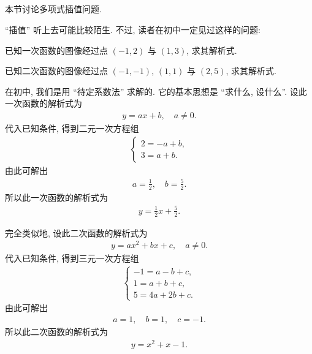 \subsection*{\Interpolation}
\markright{\Interpolation}

本节讨论多项式插值问题.

``插值'' 听上去可能比较陌生. 不过, 读者在初中一定见过这样的问题:

\begin{example}
    已知一次函数的图像经过点 $(-1,2)$ 与 $(1,3)$, 求其解析式.
\end{example}

\begin{example}
    已知二次函数的图像经过点 $(-1,-1)$, $(1,1)$ 与 $(2,5)$, 求其解析式.
\end{example}

在初中, 我们是用 ``待定系数法''  求解的. 它的基本思想是 ``求什么, 设什么''. 设此一次函数的解析式为
\begin{align*}
    y = ax + b, \quad a \neq 0.
\end{align*}
代入已知条件, 得到二元一次方程组
\begin{align*}
    \begin{cases}
        2 = -a + b, \\
        3 = a + b.
    \end{cases}
\end{align*}
由此可解出
\begin{align*}
    a = \frac12, \quad b = \frac52.
\end{align*}
所以此一次函数的解析式为
\begin{align*}
    y = \frac12 x + \frac52.
\end{align*}

完全类似地, 设此二次函数的解析式为
\begin{align*}
    y = ax^2 + bx + c, \quad a \neq 0.
\end{align*}
代入已知条件, 得到三元一次方程组
\begin{align*}
    \begin{cases}
        -1 = a - b + c, \\
        1 = a + b + c,  \\
        5 = 4a + 2b + c.
    \end{cases}
\end{align*}
由此可解出
\begin{align*}
    a = 1, \quad b = 1, \quad c = -1.
\end{align*}
所以此二次函数的解析式为
\begin{align*}
    y = x^2 + x - 1.
\end{align*}

